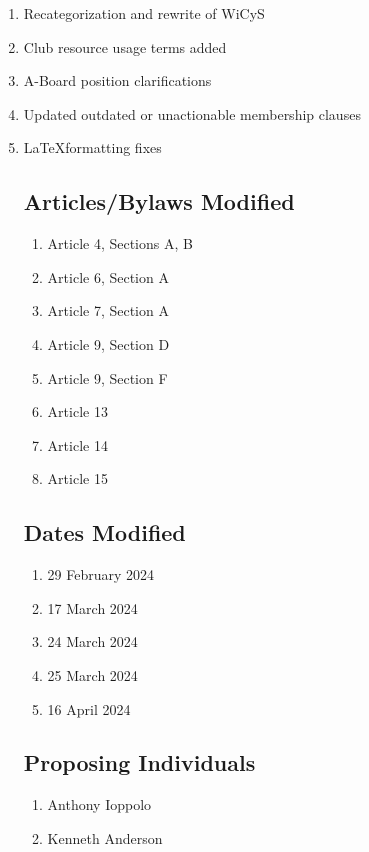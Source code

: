 \begin{enumerate}
      \item Recategorization and rewrite of WiCyS
      \item Club resource usage terms added
      \item A-Board position clarifications
      \item Updated outdated or unactionable membership clauses
      \item \LaTeX\space formatting fixes

            \subsection{Articles/Bylaws Modified}
            \begin{enumerate}
                  \item Article 4, Sections A, B 
                  \item Article 6, Section A
                  \item Article 7, Section A
                  \item Article 9, Section D
                  \item Article 9, Section F
                  \item Article 13
                  \item Article 14
                  \item Article 15
            \end{enumerate}

            \subsection{Dates Modified}
            \begin{enumerate}
                  \item 29 February 2024
                  \item 17 March 2024
                  \item 24 March 2024
                  \item 25 March 2024
                  \item 16 April 2024
            \end{enumerate}

            \subsection{Proposing Individuals}
            \begin{enumerate}
                  \item Anthony Ioppolo
                  \item Kenneth Anderson
            \end{enumerate}
\end{enumerate}